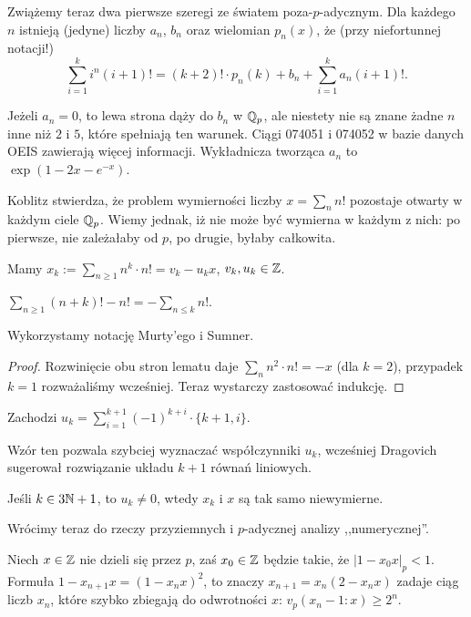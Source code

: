 Zwiążemy  teraz dwa pierwsze szeregi ze światem poza-$p$-adycznym.
Dla każdego $n$ istnieją (jedyne) liczby $a_n$, $b_n$ oraz wielomian $p_n(x)$, że (przy niefortunnej notacji!)
\[
	\sum_{i = 1}^k i^n (i+1)! = (k+2)! \cdot p_n(k) + b_n + \sum_{i = 1}^k a_n (i+1)!.
\]

Jeżeli $a_n = 0$, to lewa strona dąży do $b_n$ w $\mathbb Q_p$, ale niestety nie są znane żadne $n$ inne niż $2$ i $5$, które spełniają ten warunek.
Ciągi 074051 i 074052 w bazie danych OEIS zawierają więcej informacji.
Wykładnicza tworząca $a_n$ to $\exp(1-2x-e^{-x})$.

Koblitz stwierdza, że problem  wymierności liczby $x = \sum_n n!$ pozostaje otwarty w każdym ciele $\mathbb Q_p$.
Wiemy jednak, iż nie może być wymierna w każdym z nich: po pierwsze, nie zależałaby od $p$, po drugie, byłaby całkowita.

\begin{fakt}
	Mamy  $x_k := \sum_{n \ge 1} n^k \cdot n! = v_k - u_k x$, $v_k, u_k \in \mathbb Z$.
\end{fakt}

\begin{lemat}
	$\sum_{n \ge 1} (n+k)! - n! = - \sum_{n\le k} n!$.
\end{lemat}

Wykorzystamy notację Murty'ego i Sumner.

\begin{proof}
Rozwinięcie obu stron lematu daje $\sum_n n^2 \cdot n! = -x$ (dla $k = 2$), przypadek $k = 1$ rozważaliśmy wcześniej.
Teraz wystarczy zastosować indukcję.
\end{proof}

\begin{fakt}
	Zachodzi $u_k = \sum_{i=1}^{k+1} (-1)^{k+i} \cdot \{k+1, i\}$.
\end{fakt}

Wzór ten pozwala szybciej wyznaczać współczynniki $u_k$, wcześniej Dragovich sugerował rozwiązanie układu $k+1$ równań liniowych.

\begin{fakt}
	Jeśli $k \in 3\mathbb N + 1$, to $u_k \neq 0$, wtedy $x_k$ i $x$ są tak samo niewymierne.
\end{fakt}

Wrócimy teraz do rzeczy przyziemnych i $p$-adycznej analizy ,,numerycznej''.

\begin{fakt}
	Niech $x \in \mathbb Z$ nie dzieli się przez $p$, zaś $x_0 \in \mathbb Z$ będzie takie, że $|1 - x_0x|_p < 1$.
	Formuła $1 - x_{n+1} x = (1 - x_n x)^2$, to znaczy $x_{n+1} = x_n (2 - x_nx)$ zadaje ciąg liczb $x_n$, które szybko zbiegają do odwrotności $x$: $v_p(x_n - 1 : x) \ge 2^n$.
\end{fakt}